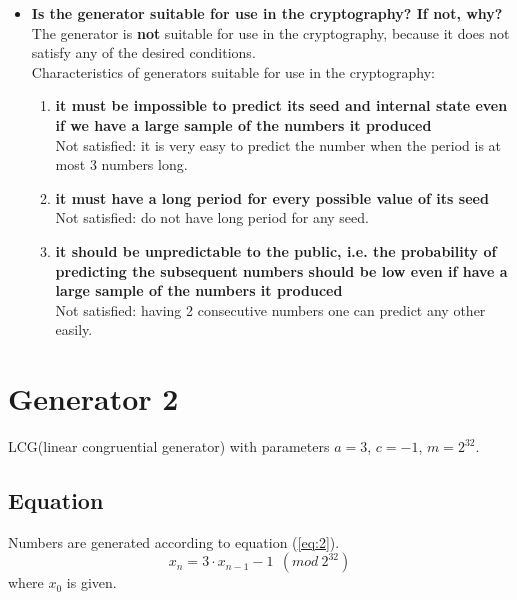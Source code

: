 \documentclass[a4paper,10pt]{article}
\begin{document}
\begin{itemize}
 \item \textbf{Is the generator suitable for use in the cryptography? If not, why?} \\
  The generator is \textbf{not} suitable for use in the cryptography, because it does not satisfy any of the desired conditions.\\
 Characteristics of generators suitable for use in the cryptography:
  \begin{enumerate}
   \item \textbf{it must be impossible to predict its seed and internal state even if we have a large sample of the numbers it produced} \\
   Not satisfied: it is very easy to predict the number when the period is at most 3 numbers long.
   \item \textbf{it must have a long period for every possible value of its seed} \\
   Not satisfied: do not have long period for any seed.
   \item \textbf{it should be unpredictable to the public, i.e. the probability of predicting the subsequent numbers should be low even if have a large sample of the numbers it produced} \\
   Not satisfied: having 2 consecutive numbers one can predict any other easily.
   \end{enumerate}

\end{itemize}

\section{Generator 2}
LCG(linear congruential generator) with parameters $a=3$, $c=-1$, $m=2^{32}$.
\subsection{Equation}
Numbers are generated according to equation (\ref{eq:2}).
\begin{equation}
\label{eq:2}
  x_n = 3 \cdot x_{n-1} - 1\ \ (mod\ 2^{32}) 
\end{equation}
where ${x_0}$ is given. \\
\end{document}
